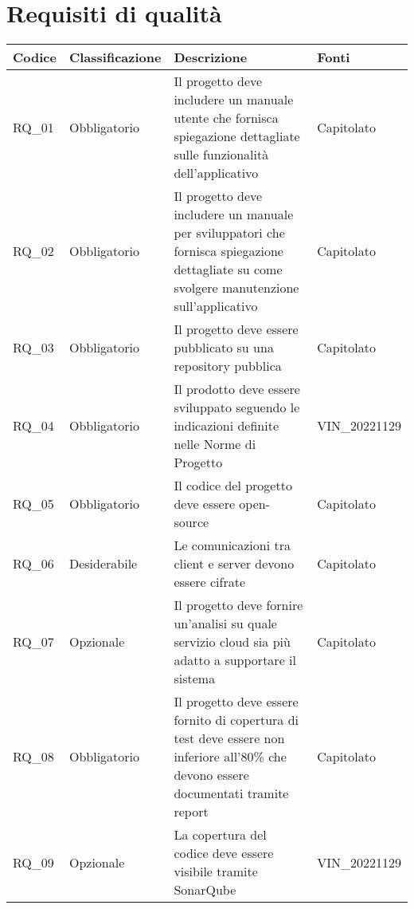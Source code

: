 \section{Requisiti di qualità}
\begin{center}
    \begin{xltabular}{\linewidth}{|l|l|X|l|}
    \hline
    \textbf{Codice} & \textbf{Classificazione} & \textbf{Descrizione} & \textbf{Fonti} \\
    \hline
    RQ\_01 & Obbligatorio & Il progetto deve includere un manuale utente che fornisca spiegazione dettagliate sulle funzionalità dell'applicativo & Capitolato \\

    \hline
    RQ\_02 & Obbligatorio & Il progetto deve includere un manuale per sviluppatori che fornisca spiegazione dettagliate su come svolgere manutenzione sull'applicativo & Capitolato \\

    \hline
    RQ\_03 & Obbligatorio & Il progetto deve essere pubblicato su una repository pubblica & Capitolato \\

    \hline
    RQ\_04 & Obbligatorio & Il prodotto deve essere sviluppato seguendo le indicazioni definite nelle Norme di Progetto & VIN\_20221129 \\

    \hline
    RQ\_05 & Obbligatorio & Il codice del progetto deve essere open-source & Capitolato \\

    \hline
    RQ\_06 & Desiderabile & Le comunicazioni tra client e server devono essere cifrate & Capitolato \\

    \hline
    RQ\_07 & Opzionale & Il progetto deve fornire un'analisi su quale servizio cloud sia più adatto a supportare il sistema & Capitolato \\

    \hline
    RQ\_08 & Obbligatorio & Il progetto deve essere fornito di copertura di test deve essere non inferiore all'80\% che devono essere documentati tramite report & Capitolato \\

    \hline
    RQ\_09 & Opzionale & La copertura del codice deve essere visibile tramite SonarQube & VIN\_20221129 \\

    \hline

    \end{xltabular}

\end{center}

